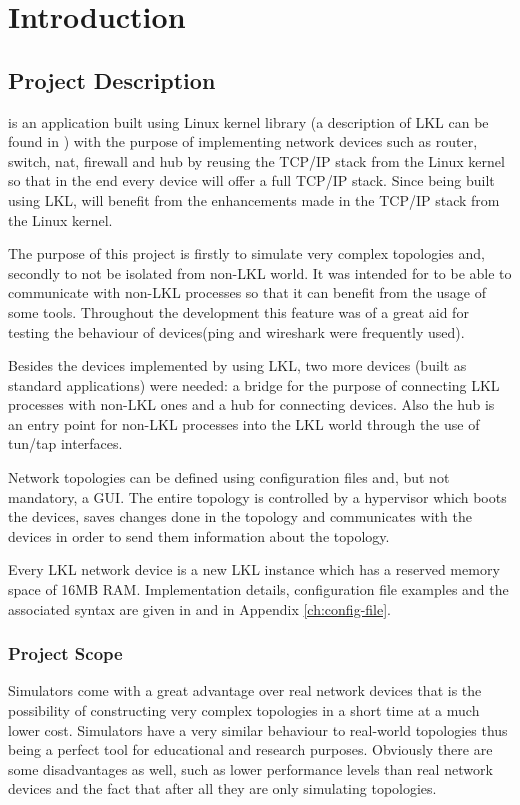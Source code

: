 \chapter{Introduction}
\label{chapter:intro}

\section{Project Description}
\label{sec:proj}

\project is an application built using Linux kernel library (a description of LKL can be found in ) with the purpose of implementing network devices such as router, switch, nat, firewall and hub by reusing the TCP/IP stack from the Linux kernel so that in the end every device will offer a full TCP/IP stack. Since being built using LKL, \project will benefit from the enhancements made in the TCP/IP stack from the Linux kernel.

The purpose of this project is firstly to simulate very complex topologies and, secondly to not be isolated from non-LKL world.
It was intended for \project to be able to communicate with non-LKL processes so that it can benefit from the usage of some tools. Throughout the \project development this feature was of a great aid for testing the behaviour of devices(ping and wireshark were frequently used). 

Besides the devices implemented by using LKL, two more devices (built as standard applications) were needed: a bridge for the purpose of connecting LKL processes with non-LKL ones and a hub for connecting \project devices. Also the hub is an entry point for non-LKL processes into the LKL world through the use of tun/tap interfaces.  

Network topologies can be defined using configuration files and, but not mandatory, a GUI. The entire topology is controlled by a hypervisor which boots the devices, saves changes done in the topology and communicates with the devices in order to send them information about the topology.

Every LKL network device is a new LKL instance which has a reserved memory space of 16MB RAM.
Implementation details, configuration file examples and the associated syntax are given in  and in Appendix  \ref{ch:config-file}.
\subsection{Project Scope}
\label{sub-sec:proj-scope}
Simulators come with a great advantage over real network devices that is the possibility of constructing very complex topologies in a short time at a much lower cost. Simulators have a very similar behaviour to real-world topologies thus being a perfect tool for educational and research purposes. Obviously there are some disadvantages as well, such as lower performance levels than real network devices and the fact that after all they are only simulating topologies.

